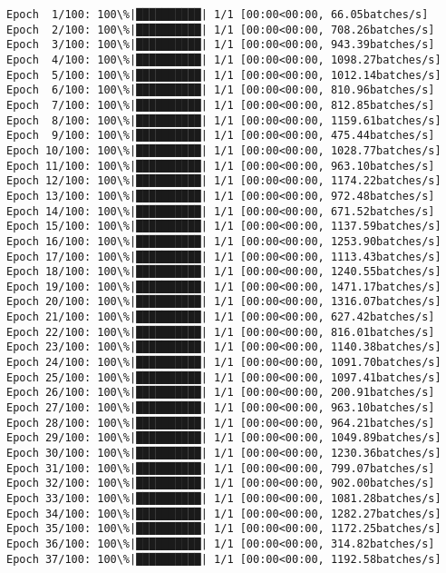 \documentclass[11pt]{article}
\begin{document}
    \begin{Verbatim}[commandchars=\\\{\}]
Epoch  1/100: 100\%|██████████| 1/1 [00:00<00:00, 66.05batches/s]
Epoch  2/100: 100\%|██████████| 1/1 [00:00<00:00, 708.26batches/s]
Epoch  3/100: 100\%|██████████| 1/1 [00:00<00:00, 943.39batches/s]
Epoch  4/100: 100\%|██████████| 1/1 [00:00<00:00, 1098.27batches/s]
Epoch  5/100: 100\%|██████████| 1/1 [00:00<00:00, 1012.14batches/s]
Epoch  6/100: 100\%|██████████| 1/1 [00:00<00:00, 810.96batches/s]
Epoch  7/100: 100\%|██████████| 1/1 [00:00<00:00, 812.85batches/s]
Epoch  8/100: 100\%|██████████| 1/1 [00:00<00:00, 1159.61batches/s]
Epoch  9/100: 100\%|██████████| 1/1 [00:00<00:00, 475.44batches/s]
Epoch 10/100: 100\%|██████████| 1/1 [00:00<00:00, 1028.77batches/s]
Epoch 11/100: 100\%|██████████| 1/1 [00:00<00:00, 963.10batches/s]
Epoch 12/100: 100\%|██████████| 1/1 [00:00<00:00, 1174.22batches/s]
Epoch 13/100: 100\%|██████████| 1/1 [00:00<00:00, 972.48batches/s]
Epoch 14/100: 100\%|██████████| 1/1 [00:00<00:00, 671.52batches/s]
Epoch 15/100: 100\%|██████████| 1/1 [00:00<00:00, 1137.59batches/s]
Epoch 16/100: 100\%|██████████| 1/1 [00:00<00:00, 1253.90batches/s]
Epoch 17/100: 100\%|██████████| 1/1 [00:00<00:00, 1113.43batches/s]
Epoch 18/100: 100\%|██████████| 1/1 [00:00<00:00, 1240.55batches/s]
Epoch 19/100: 100\%|██████████| 1/1 [00:00<00:00, 1471.17batches/s]
Epoch 20/100: 100\%|██████████| 1/1 [00:00<00:00, 1316.07batches/s]
Epoch 21/100: 100\%|██████████| 1/1 [00:00<00:00, 627.42batches/s]
Epoch 22/100: 100\%|██████████| 1/1 [00:00<00:00, 816.01batches/s]
Epoch 23/100: 100\%|██████████| 1/1 [00:00<00:00, 1140.38batches/s]
Epoch 24/100: 100\%|██████████| 1/1 [00:00<00:00, 1091.70batches/s]
Epoch 25/100: 100\%|██████████| 1/1 [00:00<00:00, 1097.41batches/s]
Epoch 26/100: 100\%|██████████| 1/1 [00:00<00:00, 200.91batches/s]
Epoch 27/100: 100\%|██████████| 1/1 [00:00<00:00, 963.10batches/s]
Epoch 28/100: 100\%|██████████| 1/1 [00:00<00:00, 964.21batches/s]
Epoch 29/100: 100\%|██████████| 1/1 [00:00<00:00, 1049.89batches/s]
Epoch 30/100: 100\%|██████████| 1/1 [00:00<00:00, 1230.36batches/s]
Epoch 31/100: 100\%|██████████| 1/1 [00:00<00:00, 799.07batches/s]
Epoch 32/100: 100\%|██████████| 1/1 [00:00<00:00, 902.00batches/s]
Epoch 33/100: 100\%|██████████| 1/1 [00:00<00:00, 1081.28batches/s]
Epoch 34/100: 100\%|██████████| 1/1 [00:00<00:00, 1282.27batches/s]
Epoch 35/100: 100\%|██████████| 1/1 [00:00<00:00, 1172.25batches/s]
Epoch 36/100: 100\%|██████████| 1/1 [00:00<00:00, 314.82batches/s]
Epoch 37/100: 100\%|██████████| 1/1 [00:00<00:00, 1192.58batches/s]

\end{Verbatim}
\end{document}

